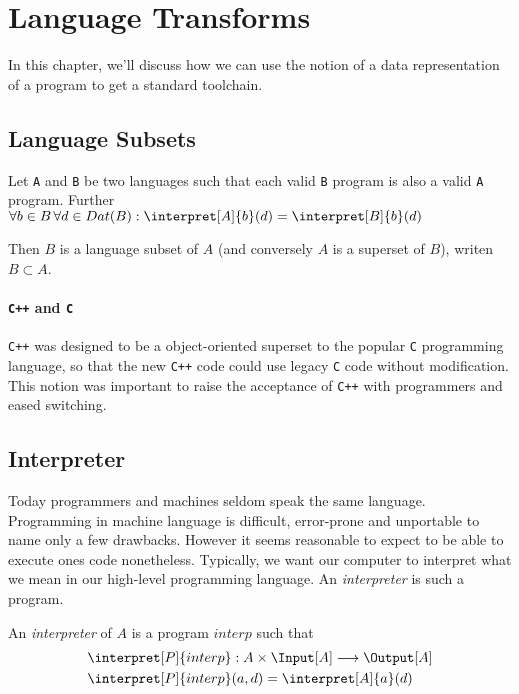 \section{Language Transforms} %
\label{sec:transforms}
In this chapter, we'll discuss how we can use the notion of a data 
representation of a program to get a standard toolchain.
\subsection{Language Subsets} %
\label{sub:Language Subsets}
\begin{defn}
	Let {\tt A} and {\tt B} be two languages such that each valid {\tt B} 
	program is also a valid {\tt A} program. Further 
	$\forall b\in B\, \forall d\in Dat(B): \interpret[A]{b}(d) = \interpret[B]{b}(d)$

	Then $B$ is a language subset of $A$ (and conversely $A$ is a superset of
	$B$), writen $B \subset A$.
\end{defn}
\paragraph{{\tt C++}  and {\tt C} } %
\label{par:Cpp and C}
{\tt C++} was designed to be a object-oriented superset to the popular {\tt C}
programming language, so that the new {\tt C++} code could use legacy {\tt C}
code without modification. This notion was important to raise the acceptance of
{\tt C++} with programmers and eased switching.
\subsection{Interpreter} %
\label{sub:Interpreter}
Today programmers and machines seldom speak the same language. Programming in 
machine language is difficult, error-prone and unportable to name only a few 
drawbacks. However it seems reasonable to expect to be able to execute ones 
code nonetheless. Typically, we want our computer to interpret what we mean 
in our high-level programming language. An {\em interpreter} is such a program.

\begin{defn}
	An {\em interpreter} of $A$ is a program $interp$ such that
	\begin{align*}
			\interpret[P]{interp}&: A \times \Input[A] \longrightarrow \Output[A] \\
			\interpret[P]{interp}&(a, d) = \interpret[A]{a}(d)
	\end{align*}
\end{defn}

